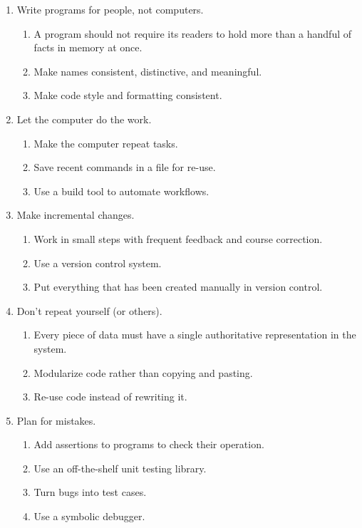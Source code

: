 \documentclass[10pt]{article}
\begin{document}
{\footnotesize
\begin{enumerate}

\item Write programs for people, not computers.
  \begin{enumerate}
  \item A program should not require its readers to hold more than a handful of facts in memory at once.
  \item Make names consistent, distinctive, and meaningful.
  \item Make code style and formatting consistent.
  \end{enumerate}

\item Let the computer do the work.
  \begin{enumerate}
  \item Make the computer repeat tasks.
  \item Save recent commands in a file for re-use.
  \item Use a build tool to automate workflows.
  \end{enumerate}

\item Make incremental changes.
  \begin{enumerate}
  \item Work in small steps with frequent feedback and course correction.
  \item Use a version control system.
  \item Put everything that has been created manually in version control.
  \end{enumerate}

\item Don't repeat yourself (or others).
  \begin{enumerate}
  \item Every piece of data must have a single authoritative representation in the system.
  \item Modularize code rather than copying and pasting.
  \item Re-use code instead of rewriting it.
  \end{enumerate}

\item Plan for mistakes.
  \begin{enumerate}
  \item Add assertions to programs to check their operation.
  \item Use an off-the-shelf unit testing library.
  \item Turn bugs into test cases.
  \item Use a symbolic debugger.
  \end{enumerate}


\end{enumerate}}
\end{document}
